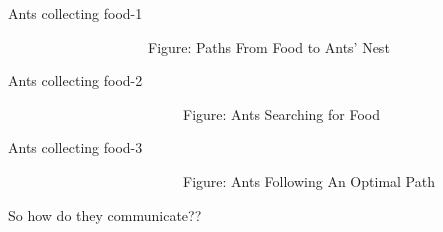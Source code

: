 \documentclass[table]{beamer}
\begin{document}
\begin{frame}{Ants collecting food-1}
	\begin{figure}
		\centering
		\def\svgscale{0.6}
		
	\end{figure}
	\ \ \ \ \ \ \ \ \ \ \ \ \ \ \ \ \ \ \ \ {\color{blue}Figure:} Paths From Food to Ants' Nest
\end{frame}

\begin{frame}{Ants collecting food-2}
		\begin{figure}
			\centering
			\def\svgscale{0.6}
			
		\end{figure}
		\ \ \ \ \ \ \ \ \ \ \ \ \ \ \ \ \ \ \ \ \ \ \ \ \ {\color{blue}Figure:} Ants Searching for Food
\end{frame}


\begin{frame}{Ants collecting food-3}
		\begin{figure}
			\centering
			\def\svgscale{0.6}
			
		\end{figure}
		\ \ \ \ \ \ \ \ \ \ \ \ \ \ \ \ \ \ \ \ \ \ \ \ \ {\color{blue}Figure:} Ants Following An Optimal Path
\end{frame}


\begin{frame}
	\centering
	\vspace{\baselineskip}	\vspace{\baselineskip}
	So how do they communicate??\\ 
	{\vspace{\baselineskip}	\vspace{\baselineskip}}
	\uncover<2->{\textcolor{red}{\huge Pheromone}}
	\vspace{\baselineskip}	\vspace{\baselineskip}
	\begin{figure}
	\end{figure}
\end{frame}
\end{document}

